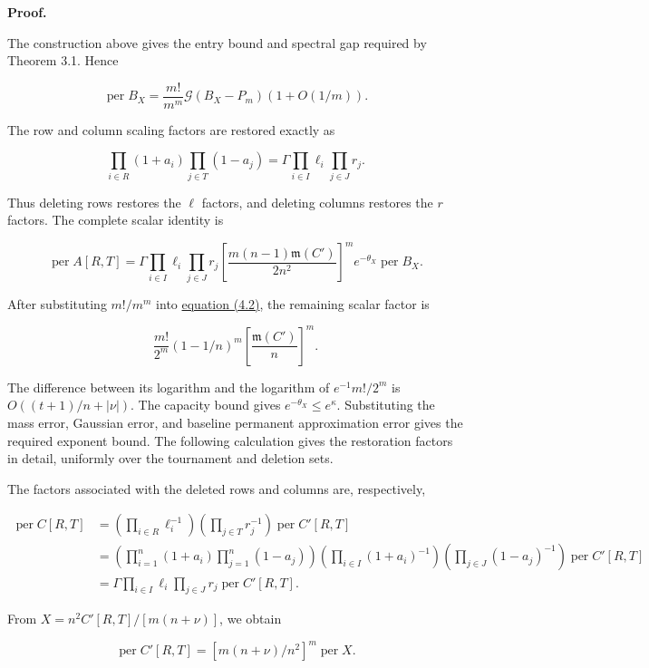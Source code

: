 \documentclass[11pt,a4paper]{article}
\begin{document}
\textbf{Proof.}

The construction above gives the entry bound and spectral gap required by Theorem 3.1. Hence

\[
\operatorname{per}B_X=\frac{m!}{m^m}\mathcal G(B_X-P_m)(1+O(1/m)).
\]

The row and column scaling factors are restored exactly as

\[
\prod_{i\in R}(1+a_i)\prod_{j\in T}(1-a_j)=\Gamma\prod_{i\in I}\ell_i\prod_{j\in J}r_j.
\]

Thus deleting rows restores the \(\ell\) factors, and deleting columns restores the \(r\) factors. The complete scalar identity is

\begin{equation}
\operatorname{per}A[R,T]=\Gamma\prod_{i\in I}\ell_i\prod_{j\in J}r_j\left[\frac{m(n-1)\mathfrak m(C')}{2n^2}\right]^m e^{-\theta_X}\operatorname{per}B_X.
\tag{4.2}
\label{eq-exact-restoration}
\end{equation}

After substituting \(m!/m^m\) into \hyperref[eq-exact-restoration]{equation (4.2)}, the remaining scalar factor is

\[
\frac{m!}{2^m}(1-1/n)^m\left[\frac{\mathfrak m(C')}{n}\right]^m.
\]

The difference between its logarithm and the logarithm of \(e^{-1}m!/2^m\) is \(O((t+1)/n+|\nu|)\). The capacity bound gives \(e^{-\theta_X}\le e^\kappa\). Substituting the mass error, Gaussian error, and baseline permanent approximation error gives the required exponent bound. The following calculation gives the restoration factors in detail, uniformly over the tournament and deletion sets.

The factors associated with the deleted rows and columns are, respectively,

\[
\begin{aligned}
\operatorname{per}C[R,T]
&=\left(\prod_{i\in R}\ell_i^{-1}\right)
\left(\prod_{j\in T}r_j^{-1}\right)\operatorname{per}C'[R,T]\\
&=\left(\prod_{i=1}^n(1+a_i)\prod_{j=1}^n(1-a_j)\right)
\left(\prod_{i\in I}(1+a_i)^{-1}\right)
\left(\prod_{j\in J}(1-a_j)^{-1}\right)\operatorname{per}C'[R,T]\\
&=\Gamma\prod_{i\in I}\ell_i\prod_{j\in J}r_j\operatorname{per}C'[R,T].
\end{aligned}
\]

From \(X=n^2C'[R,T]/[m(n+\nu)]\), we obtain

\[
\operatorname{per}C'[R,T]=[m(n+\nu)/n^2]^m\operatorname{per}X.
\]
\end{document}
